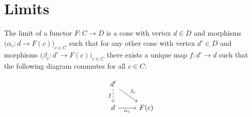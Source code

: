 \section{Limits}

\begin{definition}[Limit]
	The limit of a functor $F:C\to D$ is a cone with vertex $d\in D$ and morphisms
	$\big(\alpha_c: d \to F(c)\big)_{c\in C}$ such that for any other cone with
	vertex $d'\in D$ and morphisms $\big(\beta_c: d' \to F(c)\big)_{c\in C}$ there
	exists a unique map $f:d'\to d$ such that the following diagram commutes for
	all $c\in C$: \parencite{leinster:basic_category_theory}

	\[\begin{tikzcd}
		{d'} \\
		d & {F(c)}
		\arrow["{\alpha_c}"', from=2-1, to=2-2]
		\arrow["{\beta_c}", from=1-1, to=2-2]
		\arrow["f"', dashed, from=1-1, to=2-1]
	\end{tikzcd}\]
\end{definition}

